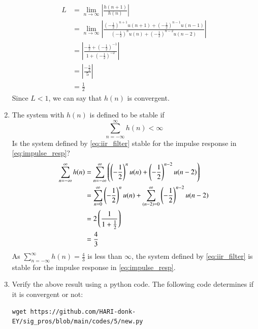 \documentclass[journal,12pt,twocolumn]{IEEEtran}
\renewcommand\thesection{\arabic{section}}
\begin{document}
\begin{enumerate}[label=\thesection.\arabic*]
\begin{align}
L &= \lim_{n\to\infty}\left|\frac{h(n+1)}{h(n)}\right|\\
&= \lim_{n\to\infty}\left|\frac{\left(-\frac{1}{2}\right)^{n+1}u(n+1)+\left(-\frac{1}{2}\right)^{n-1}u(n-1)}{\left(-\frac{1}{2}\right)^nu(n)+\left(-\frac{1}{2}\right)^{n-2}u(n-2)}\right|\\
& = \left|\frac{-\frac{1}{2}+\left(-\frac{1}{2}\right)^{-1}}{1+\left(-\frac{1}{2}\right)^{-2}}\right|\\
& = \left|\frac{-\frac{5}{2}}{5}\right|\\
& = \frac{1}{2}
\end{align}
Since $L < 1$, we can say that $h(n)$ is convergent.\\


\item The system with $h(n)$ is defined to be stable if
\begin{equation}
\sum_{n=-\infty}^{\infty}h(n) < \infty
\end{equation}
Is the system defined by \eqref{eq:iir_filter} stable for the impulse response in \eqref{eq:impulse_resp}?\\
\solution 
\begin{align}
\sum_{n=-\infty}^{\infty}h(n)&= \sum_{n=-\infty}^{\infty}\left(\left(-\frac{1}{2}\right)^{n}u(n)+\left(-\frac{1}{2}\right)^{n-2}u(n-2)\right)\\
&=\sum_{n=0}^{\infty}\left(-\frac{1}{2}\right)^{n}u(n) + \sum_{(n-2)=0}^{\infty}\left(-\frac{1}{2}\right)^{n-2}u(n-2)\\
&=2 \left( \frac{1}{1+\frac{1}{2}}\right)\\
&=\frac43
\end{align}
As $\sum_{n=-\infty}^{\infty}h(n)=\frac{4}{3}$ is less than $\infty$, the system defined by \eqref{eq:iir_filter} is stable for the impulse response in \eqref{eq:impulse_resp}.\\

\item Verify the above result using a python code.
\solution The following code determines if it is convergent or not:
\begin{lstlisting}
wget https://github.com/HARI-donk-EY/sig_pros/blob/main/codes/5/new.py
\end{lstlisting}


\end{enumerate}
\end{document}
